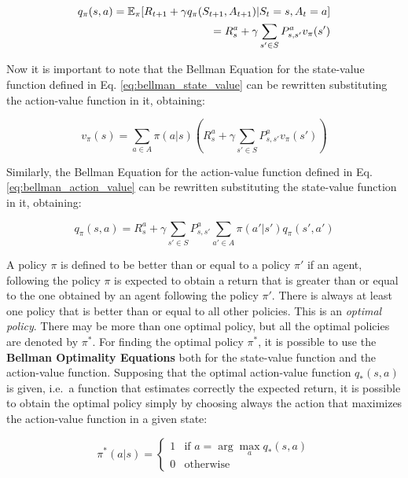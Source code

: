 \begin{equation} \label{eq:bellman_action_value}
\begin{split}
    q_{\pi}(s, a) = \operatorname{\mathbb{E}}_{\pi}[R_{t+1} + \gamma q_{\pi}(S_{t+1}, A_{t+1}) | S_t = s, A_t = a] \\
    = R_s^a + \gamma \sum_{s' \in S} P_{s, s'}^a v_{\pi}(s')
    \end{split}
\end{equation}

Now it is important to note that the Bellman Equation for the state-value function defined in Eq. \ref{eq:bellman_state_value} can be rewritten substituting the action-value function in it, obtaining:

\begin{equation}
    v_{\pi}(s) = \sum_{a \in A} \pi(a|s)(R_s^a + \gamma \sum_{s' \in S} P_{s, s'}^a v_{\pi}(s'))
\end{equation}

Similarly, the Bellman Equation for the action-value function defined in Eq. \ref{eq:bellman_action_value} can be rewritten substituting the state-value function in it, obtaining:

\begin{equation}
    q_{\pi}(s, a) = R_s^a + \gamma \sum_{s' \in S} P_{s, s'}^a \sum_{a' \in A} \pi(a'|s')q_{\pi}(s', a')
\end{equation}



A policy $\pi$ is defined to be better than or equal to a policy $\pi'$ if an agent, following the policy $\pi$ is expected to obtain a return that is greater than or equal to the one obtained by an agent following the policy $\pi'$.
There is always at least one policy that is better than or equal to all other policies.
This is an \textit{optimal policy}.
There may be more than one optimal policy, but all the optimal policies are denoted by $\pi^*$.
For finding the optimal policy $\pi^*$, it is possible to use the \textbf{Bellman Optimality Equations} both for the state-value function and the action-value function.
Supposing that the optimal action-value function $q_*(s, a)$ is given, i.e.\ a function that estimates correctly the expected return,
it is possible to obtain the optimal policy simply by choosing always the action that maximizes the action-value function in a given state:

\begin{equation}
    \label{eq:optimal_policy}
    \pi^*(a|s) = \begin{cases}
        1 & \text{if } a = \arg\max_{a} q_*(s, a) \\
        0 & \text{otherwise}
    \end{cases}
\end{equation}



